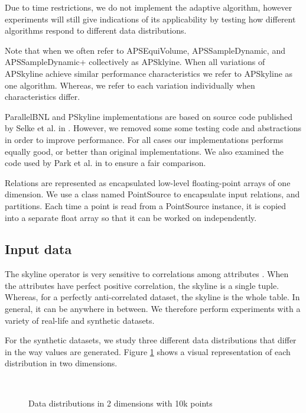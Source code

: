 \documentclass[12pt,a4paper,twoside]{report}
\begin{document}
Due to time restrictions, we do not implement the adaptive algorithm,
however experiments will still give indications of its applicability
by testing how different algorithms respond to different data
distributions.

Note that when we often refer to APSEquiVolume, APSSampleDynamic, and
APSSampleDynamic+ collectively as APSklyine. When all variations of
APSkyline achieve similar performance characteristics we refer to
APSkyline as one algorithm. Whereas, we refer to each variation
individually when characteristics differ.

ParallelBNL and PSkyline implementations are based on source code
published by Selke et al. in \cite{selke2010highly}.  However, we
removed some some testing code and abstractions in order to improve
performance. For all cases our implementations performs equally good,
or better than original implementations. We also examined the code
used by Park et al.  in \cite{park2009parallel} to ensure a fair
comparison.

Relations are represented as encapsulated low-level floating-point
arrays of one dimension. We use a class named PointSource to
encapsulate input relations, and partitions. Each time a point is read
from a PointSource instance, it is copied into a separate float array
so that it can be worked on independently.

\subsection{Input data}
\label{sec:input-data}

The skyline operator is very sensitive to correlations among
attributes \cite{chaudhuri2006robust}. When the attributes have
perfect positive correlation, the skyline is a single tuple. Whereas,
for a perfectly anti-correlated dataset, the skyline is the whole
table. In general, it can be anywhere in between. We therefore
perform experiments with a variety of real-life and synthetic
datasets. 

For the synthetic datasets, we study three different data
distributions that differ in the way values are generated.  Figure
\ref{fig:test3distributions} shows a visual representation of each
distribution in two dimensions.

\begin{figure}[H]
	\centering
		\\
	\caption{Data distributions in 2 dimensions with 10k points}
	\label{fig:test3distributions}
\end{figure}
\end{document}
